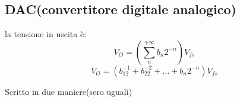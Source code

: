 \subsection{DAC(convertitore digitale analogico)}
la tensione in uscita è:
\begin{equation*}
    V_O = (\sum_n^{+\infty} b_n 2^{-n}) V_{fs}
\end{equation*}
\begin{equation*}
    V_O = (b_12^{-1} + b_22^{-2} + \dots + b_n2^{-n}) V_{fs}
\end{equation*}

Scritto in due maniere(sero uguali)

